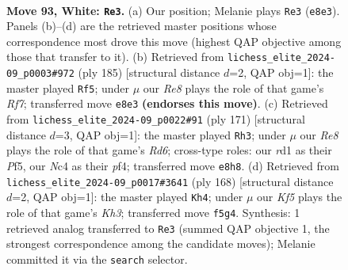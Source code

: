 \documentclass[11pt]{article}
\begin{document}
\clearpage

\begin{figure}[p]\centering
\begin{subfigure}{0.46\textwidth}\centering
\resizebox{\linewidth}{!}{%
\newchessgame
\chessboard[
  setfen={4R3/1k6/8/5K2/2N5/8/6P1/3r4 w - - 50 93},
  showmover=false,
  pgfstyle=straightmove, color=movearrow, markmove={e8-e3}
]}
\caption{}
\end{subfigure}\hfill
\begin{subfigure}{0.46\textwidth}\centering
\resizebox{\linewidth}{!}{%
\newchessgame
\chessboard[
  setfen={3k4/8/8/8/4R3/2K4p/5r2/8 b - - 17 93},
  showmover=false,
  pgfstyle=straightmove, color=movearrow, markmove={f2-f5}
]}
\caption{}
\end{subfigure}
\\[4pt]
\begin{subfigure}{0.46\textwidth}\centering
\resizebox{\linewidth}{!}{%
\newchessgame
\chessboard[
  setfen={8/2k5/8/5p2/5P2/3r4/5K2/R7 b - - 41 86},
  showmover=false,
  pgfstyle=straightmove, color=movearrow, markmove={d3-h3}
]}
\caption{}
\end{subfigure}\hfill
\begin{subfigure}{0.46\textwidth}\centering
\resizebox{\linewidth}{!}{%
\newchessgame
\chessboard[
  setfen={8/8/8/7P/4k3/7K/5R2/1r6 w - - 11 85},
  showmover=false,
  pgfstyle=straightmove, color=movearrow, markmove={h3-h4}
]}
\caption{}
\end{subfigure}
\caption{\textbf{Move 93, White: \texttt{Re3}.} (a) Our position; Melanie plays \texttt{Re3} (\texttt{e8e3}). Panels (b)--(d) are the retrieved master positions whose correspondence most drove this move (highest QAP objective among those that transfer to it). (b) Retrieved from \texttt{lichess\_elite\_2024-09\_p0003\#972} (ply 185) [structural distance $d$=2, QAP obj=1]: the master played \texttt{Rf5}; under $\mu$ our \emph{Re8} plays the role of that game's \emph{Rf7}; transferred move \texttt{e8e3} \textbf{(endorses this move)}. (c) Retrieved from \texttt{lichess\_elite\_2024-09\_p0022\#91} (ply 171) [structural distance $d$=3, QAP obj=1]: the master played \texttt{Rh3}; under $\mu$ our \emph{Re8} plays the role of that game's \emph{Rd6}; cross-type roles: our \emph{r}d1 as their \emph{P}f5, our \emph{N}c4 as their \emph{p}f4; transferred move \texttt{e8h8}. (d) Retrieved from \texttt{lichess\_elite\_2024-09\_p0017\#3641} (ply 168) [structural distance $d$=2, QAP obj=1]: the master played \texttt{Kh4}; under $\mu$ our \emph{Kf5} plays the role of that game's \emph{Kh3}; transferred move \texttt{f5g4}. Synthesis: 1 retrieved analog transferred to \texttt{Re3} (summed QAP objective 1, the strongest correspondence among the candidate moves); Melanie committed it via the \texttt{search} selector.}
\label{fig:thought-m184}
\end{figure}
\end{document}
